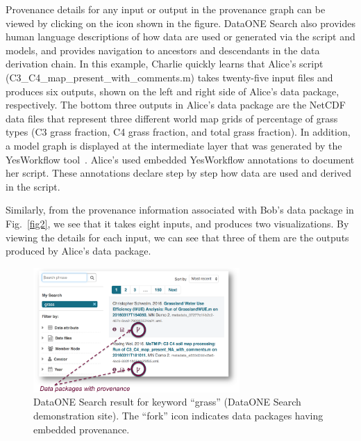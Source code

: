 \documentclass[a4paper]{llncs}
\begin{document}
Provenance details for any input or output in the provenance graph can be viewed by clicking on the icon shown in the figure. DataONE Search also provides human language descriptions of how data are used or generated via the script and models, and provides navigation to ancestors and descendants in the data derivation chain. 
%
In this example, Charlie quickly learns that Alice's script (C3\_C4\_map\_present\_with\_comments.m) takes twenty-five input files and produces six outputs, shown on the left and right side of Alice's data package, respectively. The bottom three outputs in Alice's data package are the NetCDF data files that represent three different world map grids of percentage of grass types (C3 grass fraction, C4 grass fraction, and total grass fraction). In addition, a model graph is displayed at the intermediate layer that was generated by the YesWorkflow tool~\cite{yesworkflow}. Alice's used embedded YesWorkflow annotations to document her script. These annotations declare step by step how data are used and derived in the script. 

Similarly, from the provenance information associated with Bob's data package in Fig.~\ref{fig2}, we see that it takes eight inputs, and produces two visualizations. By viewing the details for each input, we can see that three of them are the outputs produced by Alice's data package.  


\begin{figure}[t]
\centering   
\includegraphics[width=0.7\textwidth]{figs/ab-crop}
\caption{DataONE Search result for keyword  ``grass'' (DataONE Search demonstration site). The ``fork'' icon indicates data packages having embedded provenance.}
\label{fig1}
\end{figure}



%
%
\end{document}
